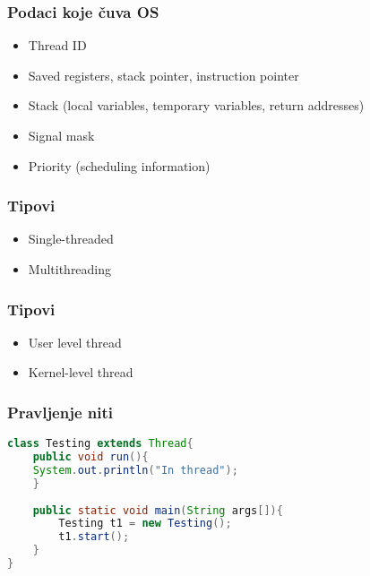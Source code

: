 \documentclass{beamer}
\begin{document}
\begin{frame}
    \frametitle{Podaci koje čuva OS}
    \begin{itemize}
        \item Thread ID \newline
        \item Saved registers, stack pointer, instruction pointer \newline
        \item Stack (local variables, temporary variables, return addresses) \newline
        \item Signal mask \newline
        \item Priority (scheduling information)
    \end{itemize}
\end{frame}

\begin{frame}
    \frametitle{Tipovi}
    \begin{itemize}
        \item Single-threaded \newline
        \item Multithreading \newline
    \end{itemize}
\end{frame}

\begin{frame}
    \frametitle{Tipovi}
    \begin{itemize}
        \item User level thread \newline
        \item Kernel-level thread
    \end{itemize}

    

\end{frame}

\begin{frame}[fragile]
    \frametitle{Pravljenje niti}
    \begin{lstlisting}[language=Java]
class Testing extends Thread{  
    public void run(){  
    System.out.println("In thread");  
    }  
    
    public static void main(String args[]){  
        Testing t1 = new Testing();  
        t1.start();  
    }  
}       
    \end{lstlisting}
\end{frame}
\end{document}
